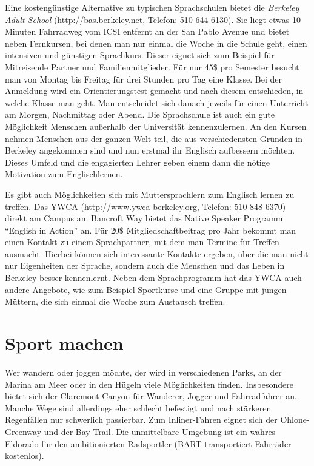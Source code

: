 \documentclass[a4paper]{scrreprt}
\begin{document}
Eine kostengünstige Alternative zu typischen Sprachschulen bietet die
\emph{Berkeley Adult School} (\url{http://bas.berkeley.net}, Telefon:
510-644-6130). Sie liegt etwas 10 Minuten Fahrradweg vom ICSI entfernt
an der San Pablo Avenue und bietet neben Fernkursen, bei denen man nur
einmal die Woche in die Schule geht, einen intensiven und günstigen
Sprachkurs. Dieser eignet sich zum Beispiel für Mitreisende Partner
und Familienmitglieder. Für nur 45\$ pro Semester besucht man von
Montag bis Freitag für drei Stunden pro Tag eine Klasse. Bei der
Anmeldung wird ein Orientierungstest gemacht und nach diesem
entschieden, in welche Klasse man geht. Man entscheidet sich danach
jeweils für einen Unterricht am Morgen, Nachmittag oder Abend. Die
Sprachschule ist auch ein gute Möglichkeit Menschen außerhalb der
Universität kennenzulernen. An den Kursen nehmen Menschen aus der
ganzen Welt teil, die aus verschiedensten Gründen in Berkeley
angekommen sind und nun erstmal ihr Englisch aufbessern
möchten. Dieses Umfeld und die engagierten Lehrer geben einem dann die
nötige Motivation zum Englischlernen. 

Es gibt auch Möglichkeiten sich mit Muttersprachlern zum Englisch
lernen zu treffen. Das YWCA (\url{http://www.ywca-berkeley.org}, Telefon:
510-848-6370) direkt am Campus am Bancroft Way bietet das Native
Speaker Programm ``English in Action'' an. Für 20\$
Mitgliedschaftbeitrag pro Jahr bekommt man einen Kontakt zu einem
Sprachpartner, mit dem man Termine für Treffen ausmacht. Hierbei können
sich interessante Kontakte ergeben, über die man nicht nur Eigenheiten
der Sprache, sondern auch die Menschen und das Leben in Berkeley
besser kennenlernt. Neben dem Sprachprogramm hat das YWCA auch
andere Angebote, wie zum Beispiel Sportkurse und eine Gruppe mit
jungen Müttern, die sich einmal die Woche zum Austausch treffen. 

\section{Sport machen}

Wer wandern oder joggen möchte, der wird in verschiedenen Parks, an
der Marina am Meer oder in den Hügeln viele Möglichkeiten
finden. Insbesondere bietet sich der Claremont Canyon für Wanderer,
Jogger und Fahrradfahrer an. Manche Wege sind allerdings eher schlecht
befestigt und nach stärkeren Regenfällen nur schwerlich
passierbar. Zum Inliner-Fahren eignet sich der Ohlone-Greenway und der
Bay-Trail. Die unmittelbare Umgebung ist ein wahres Eldorado für den
ambitionierten Radsportler (BART transportiert Fahrräder kostenlos).
\end{document}
